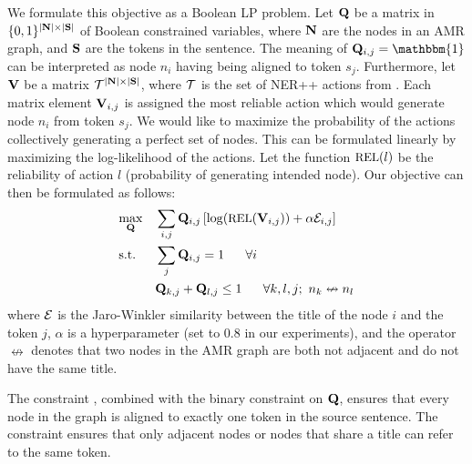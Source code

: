 We formulate this objective as a Boolean LP problem.
Let $\mathbf{Q}$ be a matrix in $\{0,1\}^{|\mathbf{N}| \times |\mathbf{S}|}$ of Boolean constrained variables,
  where $\mathbf{N}$ are the 
  nodes in an AMR graph, and $\mathbf{S}$ are the tokens in the sentence.
The meaning of $\bQ_{i,j} = \mathbbm{1}$ can be interpreted as node 
  $n_i$ having being aligned to token $s_j$.
Furthermore, let $\mathbf{V}$ be a matrix $\mathcal{T}^{|\mathbf{N}| \times |\mathbf{S}|}$, where
  $\mathcal{T}$ is the set of NER++ actions from .
Each matrix element $\mathbf{V}_{i,j}$ is assigned the most reliable action which would
  generate node $n_i$ from token $s_j$.
We would like to maximize the probability of the actions collectively generating a perfect set of nodes.
This can be formulated linearly by maximizing the log-likelihood of the actions.
Let the function $\textrm{\small{REL}}(l)$ be the reliability of action $l$ (probability of generating intended node).
Our objective can then be formulated as follows:
\begin{align}
  \label{eqn:objective}
  & \underset{\bQ}{\textrm{max}}
     & & \sum_{i,j} \bQ_{i,j} \left[ 
         \log(\textrm{\small{REL}}(\bV_{i,j}))
         + \alpha \sE_{i,j} \right] \\
  \label{eqn:constraint1}
  & \textrm{s.t.}
     & & \sum_{j} \bQ_{i,j} = 1 ~~~~~ \forall i \\
  \label{eqn:constraint2}
  & & & \bQ_{k,j} + \bQ_{l,j} \leq 1 ~~~~~ \forall k,l,j; ~ n_k \nleftrightarrow n_l
\end{align}
where $\mathcal{E}$ is the Jaro-Winkler similarity between the title of the node $i$ and the
  token $j$, $\alpha$ is a hyperparameter (set to 0.8 in our experiments),
  and the operator $\nleftrightarrow$ denotes that two nodes in the AMR graph are
  both not adjacent and do not have the same title.

The constraint , combined with the binary constraint on $\mathbf{Q}$, ensures that every node in the graph is
  aligned to exactly one token in the source sentence.
The constraint  ensures that only adjacent nodes or nodes that share a title can refer to the same token.

